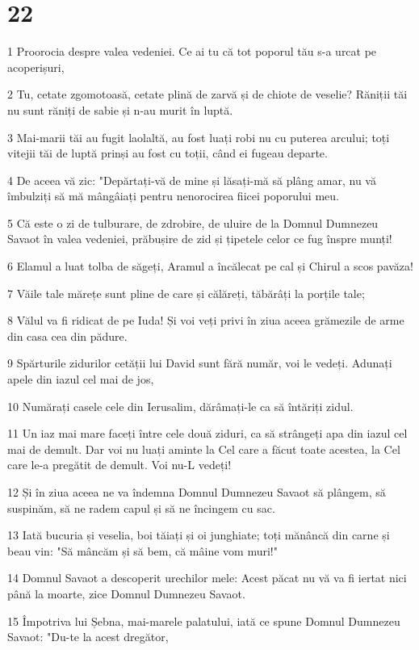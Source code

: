 \chapter{22}

\par 1 Proorocia despre valea vedeniei. Ce ai tu că tot poporul tău s-a urcat pe acoperișuri,
\par 2 Tu, cetate zgomotoasă, cetate plină de zarvă și de chiote de veselie? Răniții tăi nu sunt răniți de sabie și n-au murit în luptă.
\par 3 Mai-marii tăi au fugit laolaltă, au fost luați robi nu cu puterea arcului; toți vitejii tăi de luptă prinși au fost cu toții, când ei fugeau departe.
\par 4 De aceea vă zic: "Depărtați-vă de mine și lăsați-mă să plâng amar, nu vă îmbulziți să mă mângâiați pentru nenorocirea fiicei poporului meu.
\par 5 Că este o zi de tulburare, de zdrobire, de uluire de la Domnul Dumnezeu Savaot în valea vedeniei, prăbușire de zid și țipetele celor ce fug înspre munți!
\par 6 Elamul a luat tolba de săgeți, Aramul a încălecat pe cal și Chirul a scos pavăza!
\par 7 Văile tale mărețe sunt pline de care și călăreți, tăbărâți la porțile tale;
\par 8 Vălul va fi ridicat de pe Iuda! Și voi veți privi în ziua aceea grămezile de arme din casa cea din pădure.
\par 9 Spărturile zidurilor cetății lui David sunt fără număr, voi le vedeți. Adunați apele din iazul cel mai de jos,
\par 10 Numărați casele cele din Ierusalim, dărâmați-le ca să întăriți zidul.
\par 11 Un iaz mai mare faceți între cele două ziduri, ca să strângeți apa din iazul cel mai de demult. Dar voi nu luați aminte la Cel care a făcut toate acestea, la Cel care le-a pregătit de demult. Voi nu-L vedeți!
\par 12 Și în ziua aceea ne va îndemna Domnul Dumnezeu Savaot să plângem, să suspinăm, să ne radem capul și să ne încingem cu sac.
\par 13 Iată bucuria și veselia, boi tăiați și oi junghiate; toți mănâncă din carne și beau vin: "Să mâncăm și să bem, că mâine vom muri!"
\par 14 Domnul Savaot a descoperit urechilor mele: Acest păcat nu vă va fi iertat nici până la moarte, zice Domnul Dumnezeu Savaot.
\par 15 Împotriva lui Șebna, mai-marele palatului, iată ce spune Domnul Dumnezeu Savaot: "Du-te la acest dregător,
